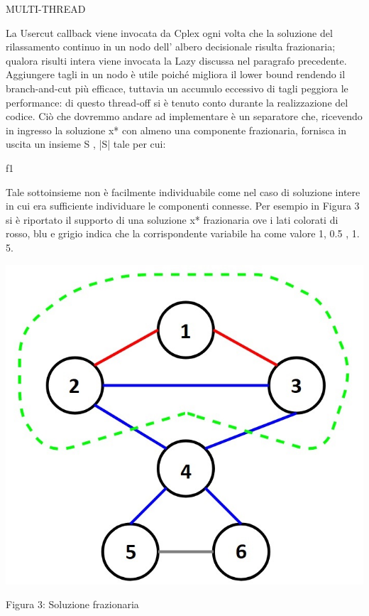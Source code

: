 \documentclass[11pt]{article}
\begin{document}
\vspace{2\baselineskip}
MULTI-THREAD
\vspace{2\baselineskip}

La Usercut callback viene invocata da Cplex ogni volta che la soluzione del rilassamento continuo in un nodo dell' albero decisionale risulta frazionaria; qualora risulti intera viene invocata la Lazy discussa nel paragrafo precedente.  Aggiungere tagli  in un nodo è utile poiché migliora il lower bound rendendo il branch-and-cut più efficace, tuttavia un accumulo eccessivo di tagli peggiora le performance: di questo thread-off si è tenuto conto durante la realizzazione del codice.  
Ciò che dovremmo andare ad implementare è un separatore che, ricevendo in ingresso la soluzione x* con almeno una componente frazionaria, fornisca in uscita un insieme S , |S|  tale per cui:

f1


Tale sottoinsieme non è facilmente individuabile come nel caso di soluzione intere in cui era sufficiente individuare le componenti connesse. Per esempio in Figura 3 si è riportato il supporto di una soluzione x* frazionaria ove i lati colorati di rosso, blu e grigio indica che la corrispondente variabile ha come valore 1, 0.5 , 1. 5.

\begin{center}
\includegraphics[scale=0.5]{SoluzioneFrazionaria}  

Figura 3: Soluzione frazionaria
\end{center}
\end{document}
